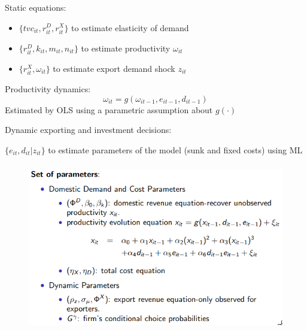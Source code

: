 \documentclass[c, dvipsnames]{beamer}  %
\begin{document}
\begin{frame}[shrink=3]
\frametitle{\insertsection} 


Static equations:

\begin{itemize}
	\item $\{tvc_{it},r^D_{it},r^X_{it}\}$ to estimate elasticity of demand
\item 
$\{r^D_{it}, k_{it}, m_{it}, n_{it}\}$ to estimate productivity $\omega_{it}$
\item 
$ \{r^X_{it}, \omega_{it}\}$ to estimate export demand shock $z_{it}$
\end{itemize}

Productivity dynamics:
$$\omega_{it} = g(\omega_{it−1}, e_{it−1}, d_{it−1})$$
Estimated by OLS using a parametric assumption about $g(·)$

Dynamic exporting and investment decisions:

$\{e_{it}, d_{it}|z_{it}\}$ to estimate parameters of the model (sunk and fixed costs) using ML

\end{frame}




\begin{frame}[shrink=3]
\frametitle{\insertsection} 

\begin{figure}
	\centering
	\includegraphics[width=0.7\linewidth]{screenshot006}
	\label{fig:screenshot006}
\end{figure}

\end{frame}
\end{document}
